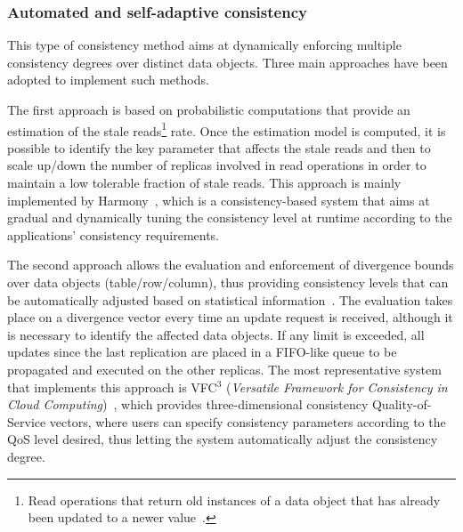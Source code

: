 
\subsubsection{Automated and self-adaptive consistency}

This type of consistency method aims at dynamically enforcing multiple consistency degrees over distinct data objects. Three main approaches have been adopted to implement such methods. 


The first approach is based on probabilistic computations that provide an estimation of the stale reads\footnote{ Read operations that return  old instances of a data object that has already been updated to a newer value~\cite{lu2015existential}.} rate. Once the estimation model is computed, it is possible to identify the key parameter that affects the stale reads and then to scale up/down the number of replicas involved in read operations in order to maintain a low tolerable fraction of stale reads. This approach is mainly implemented by Harmony~\cite{chihoub2012harmony}, which is a consistency-based system that aims at gradual and dynamically tuning the consistency level at runtime according to the applications' consistency requirements.

The second approach allows the evaluation and enforcement of divergence bounds over data objects (table/row/column), %
thus providing consistency levels that can be automatically adjusted based on statistical in\-for\-ma\-tion~\cite{PhansalkarDaniL15}. The evaluation takes place on a divergence vector every time an update request is received, although it is necessary to identify the affected data objects. If any limit is exceeded, all updates since the last replication are placed in a FIFO-like queue to be propagated and executed on the other replicas. 
The most representative system that implements this approach is VFC$^3$ (\textit{Versatile Framework for Consistency in Cloud Computing})~\cite{esteves2012quality}, which provides three-dimensional consistency Qual\-ity-of-Service vectors, where users can specify consistency parameters according to the QoS level desired, thus letting the system automatically adjust the consistency degree.

